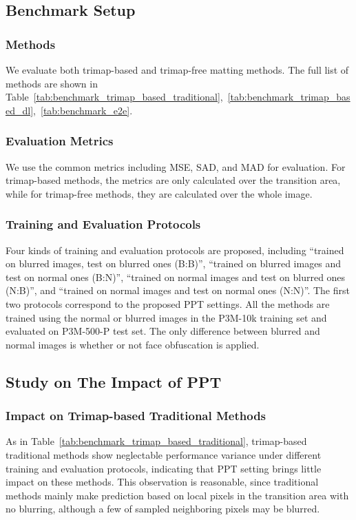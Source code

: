 \documentclass[sigconf]{acmart}
\begin{document}
\subsection{Benchmark Setup}
\subsubsection{Methods}
We evaluate both trimap-based and trimap-free matting methods. The full list of methods are shown in Table~\ref{tab:benchmark_trimap_based_traditional},~\ref{tab:benchmark_trimap_based_dl},~\ref{tab:benchmark_e2e}.

\subsubsection{Evaluation Metrics} 
We use the common metrics including MSE, SAD, and MAD for evaluation. For trimap-based methods, the metrics are only calculated over the transition area, while for trimap-free methods, they are calculated over the whole image.

\subsubsection{Training and Evaluation Protocols}
Four kinds of training and evaluation protocols are proposed, including ``trained on blurred images, test on blurred ones (B:B)'', ``trained on blurred images and test on normal ones (B:N)'', ``trained on normal images and test on blurred ones (N:B)'', and ``trained on normal images and test on normal ones (N:N)''. The first two protocols correspond to the proposed PPT settings. All the methods are trained using the normal or blurred images in the P3M-10k training set and evaluated on P3M-500-P test set. The only difference between blurred and normal images is whether or not face obfuscation is applied.



\subsection{Study on The Impact of PPT}

\subsubsection{Impact on Trimap-based Traditional Methods}
As in Table~\ref{tab:benchmark_trimap_based_traditional}, trimap-based traditional methods show neglectable performance variance under different training and evaluation protocols, indicating that PPT setting brings little impact on these methods. This observation is reasonable, since traditional methods mainly make prediction based on local pixels in the transition area with no blurring, although a few of sampled neighboring pixels may be blurred. 
\end{document}
